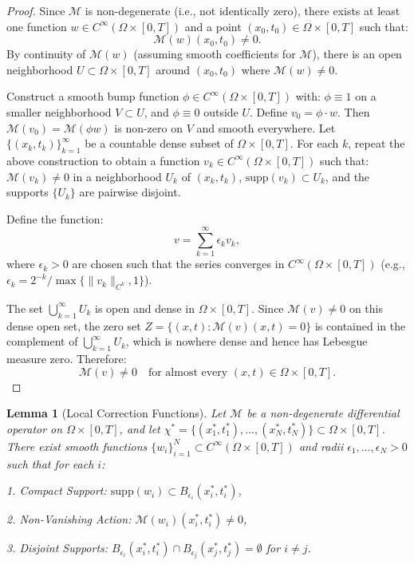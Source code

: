\documentclass{article}
\theoremstyle{plain}
\newtheorem{lemma}[theorem]{Lemma}
\theoremstyle{definition}
\theoremstyle{remark}
\begin{document}
\begin{proof}
    Since $\mathcal{M}$ is non-degenerate (i.e., not identically zero), there exists at least one function $w \in C^\infty(\Omega \times [0,T])$ and a point $(x_0, t_0) \in \Omega \times [0,T]$ such that:  
   $$
   \mathcal{M}(w)(x_0, t_0) \neq 0.
   $$  
   By continuity of $\mathcal{M}(w)$ (assuming smooth coefficients for $\mathcal{M}$), there is an open neighborhood $U \subset \Omega \times [0,T]$ around $(x_0, t_0)$ where $\mathcal{M}(w) \neq 0$.
   
   Construct a smooth bump function $\phi \in C^\infty(\Omega \times [0,T])$ with:  
   $\phi \equiv 1$ on a smaller neighborhood $V \subset U$,  
   and $\phi \equiv 0$ outside $U$.  
      Define $v_0 = \phi \cdot w$. Then $\mathcal{M}(v_0) = \mathcal{M}(\phi w)$ is non-zero on $V$ and smooth everywhere.  
   Let $\{(x_k, t_k)\}_{k=1}^\infty$ be a countable dense subset of $\Omega \times [0,T]$. For each $k$, repeat the above construction to obtain a function $v_k \in C^\infty(\Omega \times [0,T])$ such that: $\mathcal{M}(v_k) \neq 0$ in a neighborhood $U_k$ of $(x_k, t_k)$,  
   $\text{supp}(v_k) \subset U_k$,  
   and the supports $\{U_k\}$ are pairwise disjoint. 

   Define the function:  
   $$
   v = \sum_{k=1}^\infty \epsilon_k v_k,
   $$  
   where $\epsilon_k > 0$ are chosen such that the series converges in $C^\infty(\Omega \times [0,T])$ (e.g., $\epsilon_k = 2^{-k}/\max\{\|v_k\|_{C^k}, 1\}$).

   The set $\bigcup_{k=1}^\infty U_k$ is open and dense in $\Omega \times [0,T]$. Since $\mathcal{M}(v) \neq 0$ on this dense open set, the zero set $Z = \{(x,t) : \mathcal{M}(v)(x,t) = 0\}$ is contained in the complement of $\bigcup_{k=1}^\infty U_k$, which is nowhere dense and hence has Lebesgue measure zero. Therefore:  
   $$
   \mathcal{M}(v) \neq 0 \quad \text{for almost every } (x,t) \in \Omega \times [0,T].
   $$
\end{proof}

\begin{lemma}[Local Correction Functions]\label{lem:B2}
    Let $\mathcal{M}$ be a non-degenerate differential operator on $\Omega \times [0,T]$, and let $\chi^* = \{(x^*_1,t^*_1),\dots,(x^*_N,t^*_N)\} \subset \Omega \times [0,T]$. There exist smooth functions $\{w_i\}_{i=1}^N \subset C^\infty(\Omega \times [0,T])$ and radii $\epsilon_1, \dots, \epsilon_N > 0$ such that for each $i$:  
    
1. Compact Support: $\text{supp}(w_i) \subset B_{\epsilon_i}(x^*_i,t^*_i)$,  

2. Non-Vanishing Action: $\mathcal{M}(w_i)(x^*_i,t^*_i) \neq 0$, 

3. Disjoint Supports: $B_{\epsilon_i}(x^*_i,t^*_i) \cap B_{\epsilon_j}(x^*_j,t^*_j) = \emptyset$ for $i \neq j$. 
\end{lemma} 
\end{document}
